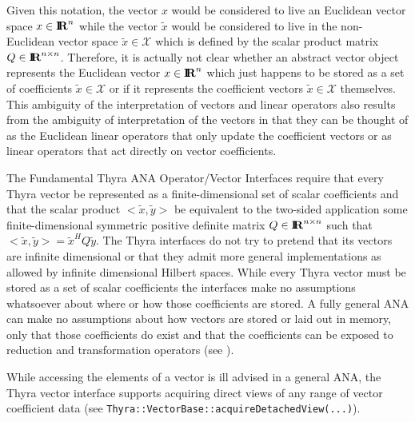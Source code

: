 \documentclass[pdf,ps2pdf,11pt]{SANDreport}
\begin{document}
Given this notation, the vector $x$ would be considered to live an Euclidean
vector space $x\in\mbox{\textbf{I}}\hspace{-0.6ex}\mbox{\textbf{R}}^n$ while the vector $\tilde{x}$ would be considered to
live in the non-Euclidean vector space $\tilde{x}\in\mathcal{X}$ which is
defined by the scalar product matrix $Q\in\mbox{\textbf{I}}\hspace{-0.6ex}\mbox{\textbf{R}}^{n\times{}n}$.  Therefore, it is
actually not clear whether an abstract vector object represents the Euclidean
vector $x\in\mbox{\textbf{I}}\hspace{-0.6ex}\mbox{\textbf{R}}^n$ which just happens to be stored as a set of coefficients
$\tilde{x}\in\mathcal{X}$ or if it represents the coefficient vectors
$\tilde{x}\in\mathcal{X}$ themselves.  This ambiguity of the interpretation of
vectors and linear operators also results from the ambiguity of interpretation
of the vectors in that they can be thought of as the Euclidean linear operators
that only update the coefficient vectors or as linear operators that act
directly on vector coefficients.

The Fundamental Thyra ANA Operator/Vector Interfaces require that every Thyra
vector be represented as a finite-dimensional set of scalar coefficients and
that the scalar product $<\tilde{x},\tilde{y}>$ be equivalent to the two-sided
application some finite-dimensional symmetric positive definite matrix
$Q\in\mbox{\textbf{I}}\hspace{-0.6ex}\mbox{\textbf{R}}^{n\times{}n}$ such that $<\tilde{x},\tilde{y}> = \tilde{x}^H Q
{}\tilde{y}$.  The Thyra interfaces do not try to pretend that its vectors are
infinite dimensional or that they admit more general implementations as
allowed by infinite dimensional Hilbert spaces.
While every Thyra vector must be stored as a set of scalar coefficients the
interfaces make no assumptions whatsoever about where or how those
coefficients are stored.  A fully general ANA can make no assumptions about
how vectors are stored or laid out in memory, only that those coefficients do
exist and that the coefficients can be exposed to reduction and transformation
operators (see {}\cite{ref:rtop_toms}).

While accessing the elements of a vector is ill advised in a general ANA, the
Thyra vector interface supports acquiring direct views of any range of vector
coefficient data (see
{}\texttt{Thyra::\-Vector\-Base\-::\-acquireDetachedView(...)}).
\end{document}
